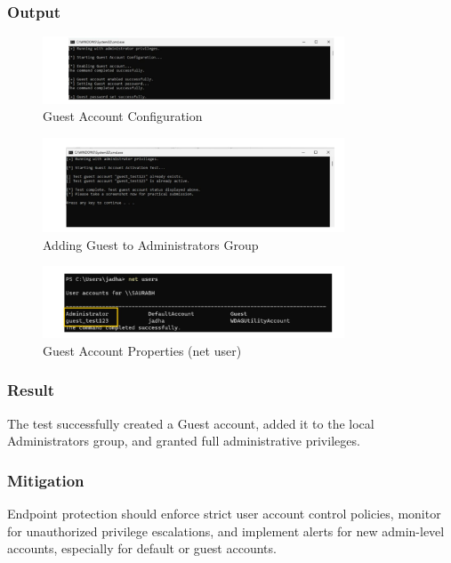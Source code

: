 \documentclass[11pt]{article}
\begin{document}
\subsubsection{Output}
\begin{figure}[H]
    \centering
    \includegraphics[width=0.8\textwidth]{./images/1.jpeg}
    \caption{Guest Account Configuration}
\end{figure}
\begin{figure}[H]
    \centering
    \includegraphics[width=0.8\textwidth]{./images/2.jpeg}
    \caption{Adding Guest to Administrators Group}
\end{figure}
\begin{figure}[H]
    \centering
    \includegraphics[width=0.8\textwidth]{./images/3.jpeg}
    \caption{Guest Account Properties (net user)}
    \end{figure}

    \subsubsection{Result}
    The test successfully created a Guest account, added it to the local Administrators group, and granted full administrative privileges.
    
    \subsubsection{Mitigation}
    Endpoint protection should enforce strict user account control policies, monitor for unauthorized privilege escalations, and implement alerts for new admin-level accounts, especially for default or guest accounts.
\end{document}
